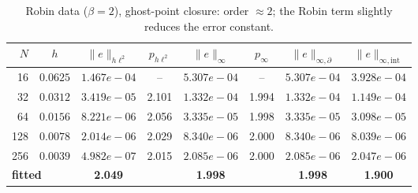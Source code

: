 \begin{table}[H]
\centering\small
\caption{Robin data ($\beta=2$), ghost-point closure: order $\approx 2$; the Robin term slightly reduces the error constant.}
\label{tab:conv-ghost-robin}
\begin{tabular}{rccccccc}
\toprule
$N$ & $h$ & $\lVert e\rVert_{h\ell^2}$ & $p_{h\ell^2}$ & $\lVert e\rVert_{\infty}$ & $p_{\infty}$ & $\lVert e\rVert_{\infty,\partial}$ & $\lVert e\rVert_{\infty,\mathrm{int}}$ \\
\midrule
16 & $0.0625$ & $1.467e-04$ & -- & $5.307e-04$ & -- & $5.307e-04$ & $3.928e-04$ \\
32 & $0.0312$ & $3.419e-05$ & 2.101 & $1.332e-04$ & 1.994 & $1.332e-04$ & $1.149e-04$ \\
64 & $0.0156$ & $8.221e-06$ & 2.056 & $3.335e-05$ & 1.998 & $3.335e-05$ & $3.098e-05$ \\
128 & $0.0078$ & $2.014e-06$ & 2.029 & $8.340e-06$ & 2.000 & $8.340e-06$ & $8.039e-06$ \\
256 & $0.0039$ & $4.982e-07$ & 2.015 & $2.085e-06$ & 2.000 & $2.085e-06$ & $2.047e-06$ \\
\midrule
\multicolumn{2}{l}{\textbf{fitted}} & \textbf{2.049} & & \textbf{1.998} & & \textbf{1.998} & \textbf{1.900} \\
\bottomrule
\end{tabular}
\end{table}